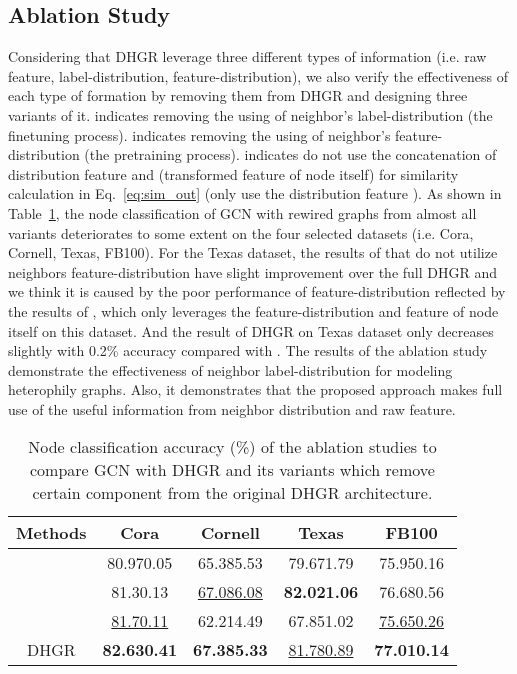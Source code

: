 \documentclass[sigconf]{acmart}
\begin{document}
	\subsection{Ablation Study}
	Considering that DHGR leverage three different types of information (i.e. raw feature, label-distribution, feature-distribution), we also verify the effectiveness of each type of formation by removing them from DHGR and designing three variants of it.  indicates removing the using of neighbor's label-distribution (the finetuning process).  indicates removing the using of neighbor's feature-distribution (the pretraining process).
	 indicates do not use the concatenation of distribution feature  and   (transformed feature of node itself) for similarity calculation in Eq.~\ref{eq:sim_out} (only use the distribution feature ). As shown in Table~\ref{tab:ablation}, the node classification of GCN with rewired graphs from almost all variants deteriorates to some extent on the four selected datasets (i.e. Cora, Cornell, Texas, FB100). For the Texas dataset, the results of   that do not utilize neighbors feature-distribution have slight improvement over the full DHGR and we think it is caused by the poor performance of feature-distribution reflected by the results of , which only leverages the feature-distribution and feature of node itself  on this dataset. And the result of DHGR on Texas dataset only decreases slightly with 0.2\% accuracy compared with . The results of the ablation study demonstrate the effectiveness of neighbor label-distribution for modeling heterophily graphs. Also, it demonstrates that the proposed approach makes full use of the useful information from  neighbor distribution and raw feature.
	\begin{table}
		\small
		\centering
		\setlength{\tabcolsep}{3.0pt}
		\caption{Node classification accuracy (\%) of the ablation studies to compare GCN with DHGR and its variants which remove certain component from the original DHGR architecture.
		}
		\label{tab:ablation}
		\begin{tabular}{ccccc}
			\toprule
			Methods  & Cora & Cornell & Texas & FB100 \\
			\midrule
			 & 80.970.05 & {65.385.53} & {79.671.79}  & {75.950.16}  \\
			 & 81.30.13  & \underline{67.086.08} & \textbf{82.021.06}  & {76.680.56}  \\
			 & \underline{81.70.11 }& 62.214.49 & 67.851.02 & \underline{75.650.26}  \\
			DHGR & \textbf{82.630.41}  & \textbf{67.385.33} & \underline{81.780.89}   & \textbf{77.010.14}  \\
			\bottomrule
		\end{tabular}
	\end{table}
\end{document}
